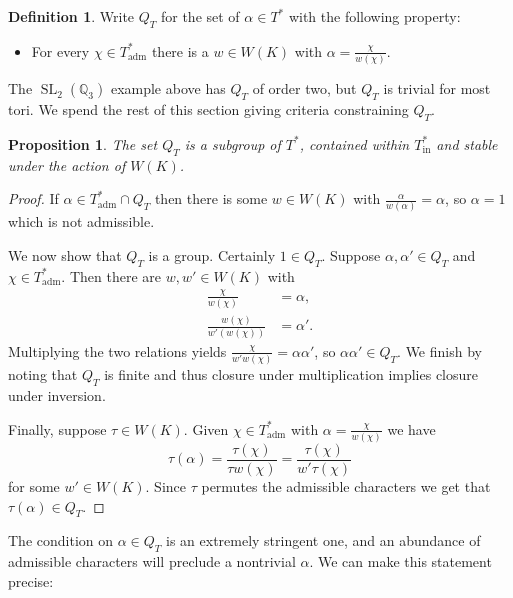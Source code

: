 \documentclass{compositio}
\theoremstyle{plain}
\newtheorem{proposition}[theorem]{Proposition}
\theoremstyle{definition}
\newtheorem{definition}[theorem]{Definition}
\DeclareMathOperator{\SL}{SL}
\newcommand{\QQ}{\mathbb{Q}}
\newcommand{\Thadm}{T^*_{\operatorname{adm}}}
\newcommand{\Thinadm}{T^*_{\operatorname{in}}}
\newcommand{\hatT}{T^*}
\begin{document}
\begin{definition}
Write $Q_T$ for the set of $\alpha \in \hatT$ with the following property:
\begin{itemize}
\item For every $\chi \in \Thadm$ there is a $w \in W(K)$ with $\alpha = \frac{\chi}{w(\chi)}$.
\end{itemize}
\end{definition}

The $\SL_2(\QQ_3)$ example above has $Q_T$ of order two, but $Q_T$ is trivial for most tori.
We spend the rest of this section giving criteria constraining $Q_T$.

\begin{proposition} \label{irr-sub}
The set $Q_T$ is a subgroup of $\hatT$, contained within $\Thinadm$ and stable under the action of $W(K)$.
\end{proposition}
\begin{proof}
If $\alpha \in \Thadm \cap Q_T$ then there is some $w \in W(K)$ with
$\frac{\alpha}{w(\alpha)} = \alpha$, so $\alpha = 1$ which is not admissible.

We now show that $Q_T$ is a group.  Certainly $1 \in Q_T$.  Suppose
$\alpha, \alpha' \in Q_T$ and $\chi \in \Thadm$.  Then there are $w, w' \in W(K)$ with
\begin{align*}
\frac{\chi}{w(\chi)} &= \alpha, \\
\frac{w(\chi)}{w'(w(\chi))} &= \alpha'.
\end{align*}
Multiplying the two relations yields $\frac{\chi}{w'w(\chi)} = \alpha\alpha'$, so
$\alpha\alpha' \in Q_T$.  We finish by noting that $Q_T$ is finite and thus closure under
multiplication implies closure under inversion.

Finally, suppose $\tau \in W(K)$.  Given $\chi \in \Thadm$ with $\alpha = \frac{\chi}{w(\chi)}$ we have
$$\tau(\alpha) = \frac{\tau(\chi)}{\tau w(\chi)} = \frac{\tau(\chi)}{w' \tau(\chi)}$$
for some $w' \in W(K)$.  Since $\tau$ permutes the admissible characters we get that $\tau(\alpha) \in Q_T$.
\end{proof}

The condition on $\alpha \in Q_T$ is an extremely stringent one, and an abundance of admissible
characters will preclude a nontrivial $\alpha$.  We can make this statement precise:
\end{document}
